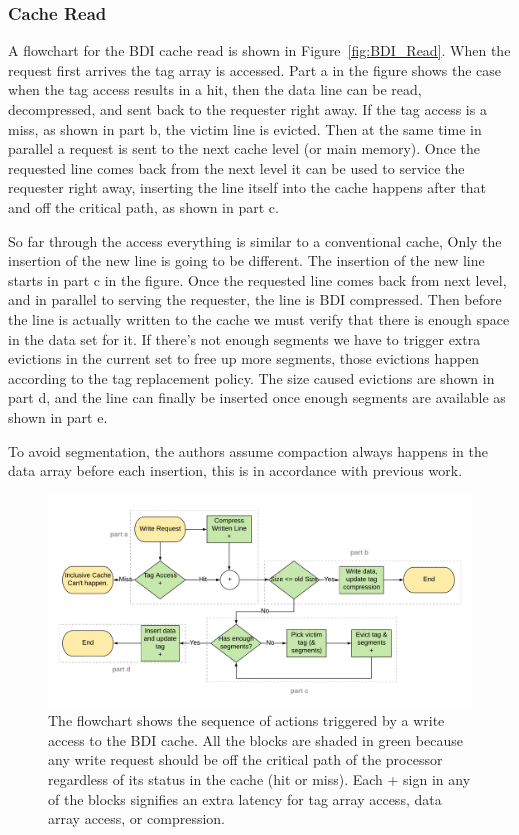 \subsubsection{Cache Read}
A flowchart for the BDI cache read is shown in Figure~\ref{fig:BDI_Read}. When the request first arrives the tag array is accessed. Part a in the figure shows the case when the tag access results in a hit, then the data line can be read, decompressed, and sent back to the requester right away. If the tag access is a miss, as shown in part b, the victim line is evicted. Then at the same time in parallel a request is sent to the next cache level (or main memory). Once the requested line comes back from the next level it can be used to service the requester right away, inserting the line itself into the cache happens after that and off the critical path, as shown in part c.\par
So far through the access everything is similar to a conventional cache, Only the insertion of the new line is going to be different. The insertion of the new line starts in part c in the figure. Once the requested line comes back from next level, and in parallel to serving the requester, the line is BDI compressed. Then before the line is actually written to the cache we must verify that there is enough space in the data set for it. If there's not enough segments we have to trigger extra evictions in the current set to free up more segments, those evictions happen according to the tag replacement policy. The size caused evictions are shown in part d, and the line can finally be inserted once enough segments are available as shown in part e.\par
To avoid segmentation, the authors assume compaction always happens in the data array before each insertion, this is in accordance with previous work.
\begin{figure}[h]
    \includegraphics[width=\textwidth]{BDI_Write.pdf}
    \caption[BDI Write]{The flowchart shows the sequence of actions triggered by a write access to the BDI cache. All the blocks are shaded in green because any write request should be off the critical path of the processor regardless of its status in the cache (hit or miss). Each + sign in any of the blocks signifies an extra latency for tag array access, data array access, or compression.}
    \label{fig:BDI_Write}
\end{figure}
